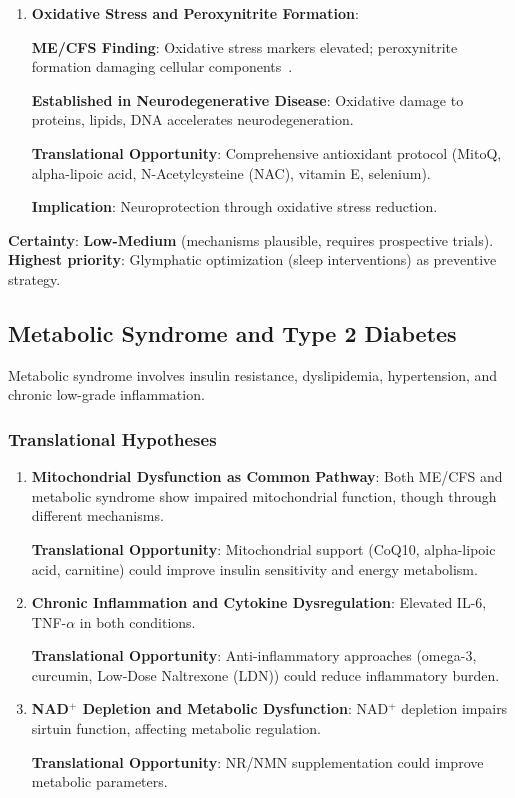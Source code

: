\begin{enumerate}
    \textbf{Implication}: NAD$^+$ restoration could support neuronal energy metabolism and protein quality control.

    \item \textbf{Oxidative Stress and Peroxynitrite Formation}:

    \textbf{ME/CFS Finding}: Oxidative stress markers elevated; peroxynitrite formation damaging cellular components~\cite{Syed2025}.

    \textbf{Established in Neurodegenerative Disease}: Oxidative damage to proteins, lipids, DNA accelerates neurodegeneration.

    \textbf{Translational Opportunity}: Comprehensive antioxidant protocol (MitoQ, alpha-lipoic acid, N-Acetylcysteine (NAC), vitamin E, selenium).

    \textbf{Implication}: Neuroprotection through oxidative stress reduction.
\end{enumerate}

\textbf{Certainty}: \textbf{Low-Medium} (mechanisms plausible, requires prospective trials). \textbf{Highest priority}: Glymphatic optimization (sleep interventions) as preventive strategy.

\subsection{Metabolic Syndrome and Type 2 Diabetes}
\label{sec:metabolic-syndrome}

Metabolic syndrome involves insulin resistance, dyslipidemia, hypertension, and chronic low-grade inflammation.

\subsubsection{Translational Hypotheses}

\begin{enumerate}
    \item \textbf{Mitochondrial Dysfunction as Common Pathway}: Both ME/CFS and metabolic syndrome show impaired mitochondrial function, though through different mechanisms.

    \textbf{Translational Opportunity}: Mitochondrial support (CoQ10, alpha-lipoic acid, carnitine) could improve insulin sensitivity and energy metabolism.

    \item \textbf{Chronic Inflammation and Cytokine Dysregulation}: Elevated IL-6, TNF-$\alpha$ in both conditions.

    \textbf{Translational Opportunity}: Anti-inflammatory approaches (omega-3, curcumin, Low-Dose Naltrexone (LDN)) could reduce inflammatory burden.

    \item \textbf{NAD$^+$ Depletion and Metabolic Dysfunction}: NAD$^+$ depletion impairs sirtuin function, affecting metabolic regulation.

    \textbf{Translational Opportunity}: NR/NMN supplementation could improve metabolic parameters.
\end{enumerate}

